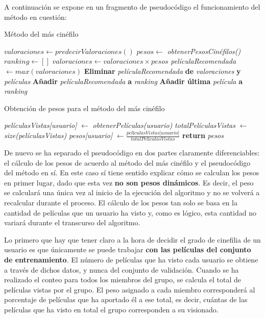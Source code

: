A continuación se expone en un fragmento de pseudocódigo el funcionamiento del método en cuestión:

\begin{algorithm}
	\caption{Método del más cinéfilo}
	\begin{algorithmic}[1]
		\State $valoraciones \gets predecirValoraciones()$
		\State $pesos \gets $ \textit{obtenerPesosCinéfilos()}
		\State $ranking \gets []$
		\State $valoraciones \gets valoraciones \times pesos$
		\State \textit{películaRecomendada} $ \gets max(valoraciones)$
		\State \textbf{Eliminar} \textit{películaRecomendada} \textbf{de} \textit{valoraciones} \textbf{y} \textit{películas}
		\State \textbf{Añadir} \textit{películaRecomendada} \textbf{a} \textit{ranking}
		\EndWhile
		\State \textbf{Añadir última} \textit{película} \textbf{a} \textit{ranking}
	\end{algorithmic}
\end{algorithm}

\begin{algorithm}
	\caption{Obtención de pesos para el método del más cinéfilo}
	\begin{algorithmic}[1]
		\State \textit{películasVistas[usuario]} $\gets$ \textit{obtenerPelículas(usuario)} 
		\EndFor
		\State \textit{totalPelículasVistas} $\gets$ \textit{size(películasVistas)}
		\State \textit{pesos[usuario]} $\gets \frac{\textit{películasVistas[usuario]}}{\textit{totalPelículasVistas}}$
		\EndFor
		\State \textbf{return} \textit{pesos}
	\end{algorithmic}
\end{algorithm}

De nuevo se ha separado el pseudocódigo en dos partes claramente diferenciables: el cálculo de los pesos de acuerdo al método del más cinéfilo y el pseudocódigo del método en sí. En este caso sí tiene sentido explicar cómo se calculan los pesos en primer lugar, dado que esta vez \textbf{no son pesos dinámicos}. Es decir, el peso se calculará una única vez al inicio de la ejecución del algoritmo y no se volverá a recalcular durante el proceso. El cálculo de los pesos tan solo se basa en la cantidad de películas que un usuario ha visto y, como es lógico, esta cantidad no variará durante el transcurso del algoritmo.

Lo primero que hay que tener claro a la hora de decidir el grado de cinefilia de un usuario es que únicamente se puede trabajar \textbf{con las películas del conjunto de entrenamiento}. El número de películas que ha visto cada usuario se obtiene a través de dichos datos, y nunca del conjunto de validación. Cuando se ha realizado el conteo para todos los miembros del grupo, se calcula el total de películas vistas por el grupo. El peso asignado a cada miembro corresponderá al porcentaje de películas que ha aportado él a ese total, es decir, cuántas de las películas que ha visto en total el grupo corresponden a su visionado.

